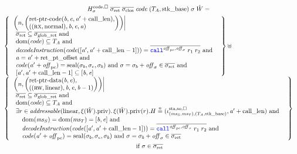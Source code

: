 \begin{multline*}
  H^\mathrm{code,\square}_\sigma \; \sigrets \; \sigcloss \; \code \;
  (\ta,\stkb) \; \sigma \; \hat{W}= \\
  \begin{array}[t]{l}
\left\{
    \begin{array}{l}
\left. \npair{\arraycolsep=0pt\left(\array{l}\retptrc(\baddr,\eaddr,\aaddr'+\calllen),\\((\rx,\normal),\baddr,\eaddr,\aaddr)\endarray\right)} \middle| \right. \\
      \begin{array}{l}
        \sigrets \subseteq \gsigrets \tand \\
        \dom(\code) \subseteq \ta \tand\\
        \decInstr{\code([\aaddr',\aaddr' + \calllen-1])} = \overline{\scall{\offpc,\offsigma}{r_1}{r_2}} \tand \\
        \aaddr = \aaddr' + \retoffset \tand \\
        \code(\aaddr'+\offpc) = \seal{\sigma_b,\sigma_e,\sigma_b} \tand \sigma = \sigma_b + \offsigma \in \sigrets \tand\\
        \lbrack \aaddr',\aaddr' + \calllen -1 \rbrack \subseteq \lbrack \baddr, \eaddr \rbrack
      \end{array}
    \end{array}
      \right\} \uplus \\
\left\{
    \begin{array}{l}
\left. \npair{\arraycolsep=0pt\left(\array{l}\retptrd(\baddr,\eaddr),\\((\rw,\linear),\baddr,\eaddr,\baddr-1)\endarray\right)} \middle| \right. \\
      \begin{array}{l}
        \sigrets \subseteq \gsigrets \tand \\
        \dom(\code) \subseteq \ta \tand\\
        \exists r \in \addressable{\linear,\pwpriv[\xi(\hat{W})]} \ldotp \pwpriv[\xi(\hat{W})](r).H \nequal (\stareg[(\ms_S,\ms_T),(\ta,\stkb)]{\spao,\square}, \aaddr'+\calllen) \tand \\
        \quad \dom(\ms_S) = \dom(\ms_T) = [\baddr,\eaddr] \tand\\
        \quad \decInstr{\code([\aaddr',\aaddr' + \calllen-1])} = \overline{\scall{\offpc,\offsigma}{r_1}{r_2}} \tand \\
        \quad \code(\aaddr'+\offpc) = \seal{\sigma_b,\sigma_e,\sigma_b} \tand \sigma = \sigma_b + \offsigma \in \sigrets
      \end{array}
    \end{array}
    \right\} \\
  \end{array}\\
    \text{ if } \sigma \in \sigrets\\
\end{multline*}
